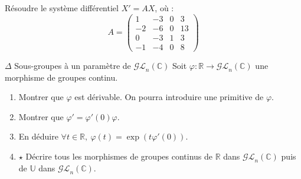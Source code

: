 \documentclass[french,a4paper]{article}
\newcommand{\R}{\mathbb{R}}
\newcommand{\C}{\mathbb{C}}
\newcommand{\U}{\mathbb{U}}
\theoremstyle{plain}
\theoremstyle{definition}
\theoremstyle{remark}
\begin{document}
\begin{ex}[Moulin.ED.27]{}
	Résoudre le système différentiel $X'=AX$, où : $$A=\begin{pmatrix}
		1&-3&0&3\\
		-2&-6&0&13\\
		0&-3&1&3\\
		-1&-4&0&8
	\end{pmatrix}$$
\end{ex}

\begin{ex}[Moulin.ED.28]{$\Delta$ Sous-groupes à un paramètre de $\mathcal{GL}_n(\C)$}
	Soit $\varphi:\R\to\mathcal{GL}_n(\C)$ une morphisme de groupes continu.
	\begin{enumerate}
		\item Montrer que $\varphi$ est dérivable. On pourra introduire une primitive de $\varphi$.
		\item Montrer que $\varphi'=\varphi'(0)\varphi$.
		\item En déduire $\forall t\in\R,\ \varphi(t)=\exp(t\varphi'(0))$.
		\item $\star$ Décrire tous les morphismes de groupes continus de $\R$ dans $\mathcal{GL}_n(\C)$ puis de $\U$ dans $\mathcal{GL}_n(\C)$.
	\end{enumerate}
\end{ex}
\end{document}
